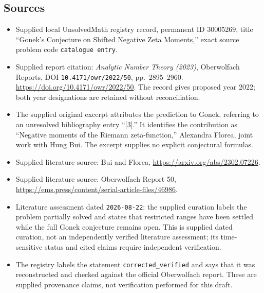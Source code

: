 \documentclass[11pt]{article}
\begin{document}
\subsection{Sources}
\begin{itemize}
\item Supplied local UnsolvedMath registry record, permanent ID \(30005269\), title ``Gonek's Conjecture on Shifted Negative Zeta Moments,'' exact source problem code \texttt{catalogue entry}.
\item Supplied report citation: \emph{Analytic Number Theory (2023)}, Oberwolfach Reports, DOI \texttt{10.4171/owr/2022/50}, pp.\ 2895--2960. \url{https://doi.org/10.4171/owr/2022/50}. The record gives proposed year 2022; both year designations are retained without reconciliation.
\item The supplied original excerpt attributes the prediction to Gonek, referring to an unresolved bibliography entry ``[3].'' It identifies the contribution as ``Negative moments of the Riemann zeta-function,'' Alexandra Florea, joint work with Hung Bui. The excerpt supplies no explicit conjectural formulas.
\item Supplied literature source: Bui and Florea, \url{https://arxiv.org/abs/2302.07226}.
\item Supplied literature source: Oberwolfach Report 50, \url{https://ems.press/content/serial-article-files/46986}.
\item Literature assessment dated \texttt{2026-08-22}: the supplied curation labels the problem partially solved and states that restricted ranges have been settled while the full Gonek conjecture remains open. This is supplied dated curation, not an independently verified literature assessment; its time-sensitive status and cited claims require independent verification.
\item The registry labels the statement \texttt{corrected\_verified} and says that it was reconstructed and checked against the official Oberwolfach report. These are supplied provenance claims, not verification performed for this draft.
\end{itemize}
\end{document}
